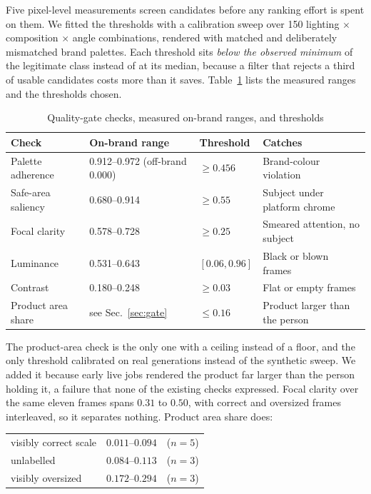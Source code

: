 \documentclass[conference]{IEEEtran}
\begin{document}
Five pixel-level measurements screen candidates before any ranking effort is spent
on them. We fitted the thresholds with a calibration sweep over 150 lighting
$\times$ composition $\times$ angle combinations, rendered with matched and
deliberately mismatched brand palettes. Each threshold sits \emph{below the observed
minimum} of the legitimate class instead of at its median, because a filter that
rejects a third of usable candidates costs more than it saves. Table~\ref{tab:gate}
lists the measured ranges and the thresholds chosen.

\begin{table}[t]
\caption{Quality-gate checks, measured on-brand ranges, and thresholds}
\label{tab:gate}
\centering
\tiny
\begin{tabular}{@{}p{1.85cm}p{1.5cm}p{1.35cm}p{2.1cm}@{}}
\toprule
\textbf{Check} & \textbf{On-brand range} & \textbf{Threshold} & \textbf{Catches} \\
\midrule
Palette adherence & 0.912--0.972 (off-brand 0.000) & $\ge 0.456$ & Brand-colour violation \\
Safe-area saliency & 0.680--0.914 & $\ge 0.55$ & Subject under platform chrome \\
Focal clarity & 0.578--0.728 & $\ge 0.25$ & Smeared attention, no subject \\
Luminance & 0.531--0.643 & $[0.06, 0.96]$ & Black or blown frames \\
Contrast & 0.180--0.248 & $\ge 0.03$ & Flat or empty frames \\
Product area share & see Sec.~\ref{sec:gate} & $\le 0.16$ & Product larger than the person \\
\bottomrule
\end{tabular}
\end{table}

The product-area check is the only one with a ceiling instead of a floor, and the
only threshold calibrated on real generations instead of the synthetic sweep. We
added it because early live jobs rendered the product far larger than the person
holding it, a failure that none of the existing checks expressed. Focal clarity over
the same eleven frames spans $0.31$ to $0.50$, with correct and oversized frames
interleaved, so it separates nothing. Product area share does:

\begin{center}
\footnotesize
\begin{tabular}{@{}lll@{}}
visibly correct scale & $0.011$--$0.094$ & ($n=5$) \\
unlabelled & $0.084$--$0.113$ & ($n=3$) \\
visibly oversized & $0.172$--$0.294$ & ($n=3$) \\
\end{tabular}
\end{center}
\end{document}
